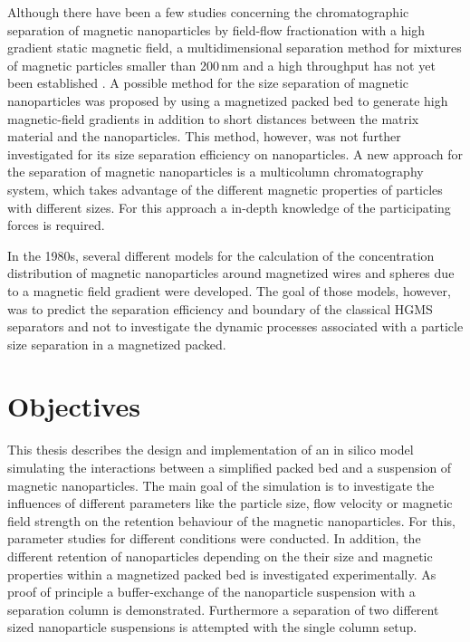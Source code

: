 Although there have been a few studies concerning the chromatographic separation of magnetic nanoparticles by field-flow fractionation with a high gradient static magnetic field, a multidimensional separation method for mixtures of magnetic particles smaller than 200\,nm and a high throughput has not yet been established \cite{kim2007development,williams2009magnetic,williams2010characterization}. A possible method for the size separation of magnetic nanoparticles was proposed by \cite{nomizu1996magnetic} using a magnetized packed bed to generate high magnetic-field gradients in addition to short distances between the matrix material and the nanoparticles. This method, however, was not further investigated for its size separation efficiency on nanoparticles. A new approach for the separation of magnetic nanoparticles is a multicolumn chromatography system, which takes advantage of the different magnetic properties of particles with different sizes. For this approach a in-depth knowledge of the participating forces is required.    

In the 1980s, several different models for the calculation of the concentration distribution of magnetic nanoparticles around magnetized wires \cite{gerber1984magnetic,davies19902,fletcher1991fine} and spheres \cite{moyer1986filtration} due to a magnetic field gradient were developed. The goal of those models, however, was to predict the separation efficiency and boundary of the classical HGMS separators and not to investigate the dynamic processes associated with a particle size separation in a magnetized packed.

\section{Objectives}
\label{sec:Objectives}

This thesis describes the design and implementation of an in silico model simulating the interactions between a simplified packed bed and a suspension of magnetic nanoparticles. The main goal of the simulation is to investigate the influences of different parameters like the particle size, flow velocity or magnetic field strength on the retention behaviour of the magnetic nanoparticles. For this, parameter studies for different conditions were conducted. In addition, the different retention of nanoparticles depending on the their size and magnetic properties within a magnetized packed bed is investigated experimentally. As proof of principle a buffer-exchange of the nanoparticle suspension with a separation column is demonstrated. Furthermore a separation of two different sized nanoparticle suspensions is attempted with the single column setup.
